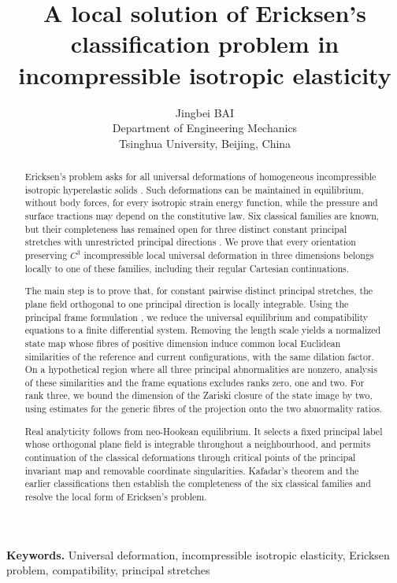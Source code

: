 \documentclass[11pt,a4paper]{article}
\newcommand{\keywords}[1]{\par\smallskip\noindent\textbf{Keywords.} #1\par}
\numberwithin{equation}{section}
\theoremstyle{plain}
\theoremstyle{definition}
\theoremstyle{remark}
\begin{document}
\title{A local solution of Ericksen's classification problem in incompressible isotropic elasticity}
\author{Jingbei BAI\\
{\small Department of Engineering Mechanics}\\
{\small Tsinghua University, Beijing, China}}
\date{}
\maketitle
\begin{abstract}
Ericksen's problem asks for all universal deformations of homogeneous
incompressible isotropic hyperelastic solids \cite{Ericksen1954}.
Such deformations can be maintained in equilibrium, without body forces,
for every isotropic strain energy function, while the pressure and surface
tractions may depend on the constitutive law. Six classical families are
known, but their completeness has remained open for three distinct
constant principal stretches with unrestricted principal directions
\cite{YavariGoriely2023,Yavari2026Residual}. We prove that every orientation
preserving $C^3$ incompressible local universal deformation in three
dimensions belongs locally to one of these families, including their
regular Cartesian continuations.

The main step is to prove that, for constant pairwise distinct principal
stretches, the plane field orthogonal to one principal direction is locally
integrable. Using the principal frame
formulation \cite{Marris1975,Marris1982}, we reduce the universal equilibrium
and compatibility equations to a finite differential system. Removing the
length scale yields a normalized state map whose fibres of positive
dimension induce common local Euclidean similarities of the reference and
current configurations, with the same dilation factor. On a hypothetical
region where all three principal abnormalities are nonzero, analysis of
these similarities and the frame equations excludes ranks zero, one and
two. For rank three, we bound the dimension of the Zariski closure of the
state image by two, using estimates for the generic fibres of the
projection onto the two abnormality ratios.

Real analyticity follows from neo-Hookean equilibrium. It selects a fixed
principal label whose orthogonal plane field is integrable throughout a
neighbourhood, and permits continuation of the classical deformations
through critical points of the principal invariant map and removable
coordinate singularities. Kafadar's theorem \cite{Kafadar1972} and the
earlier classifications
\cite{MarrisShiau1970,MarrisShiauCorr1970,MartinCarlson1976} then establish
the completeness of the six classical families and resolve the local form
of Ericksen's problem.
\end{abstract}
\keywords{Universal deformation, incompressible isotropic elasticity, Ericksen problem, compatibility, principal stretches}
\clearpage
\tableofcontents
\clearpage
\end{document}
